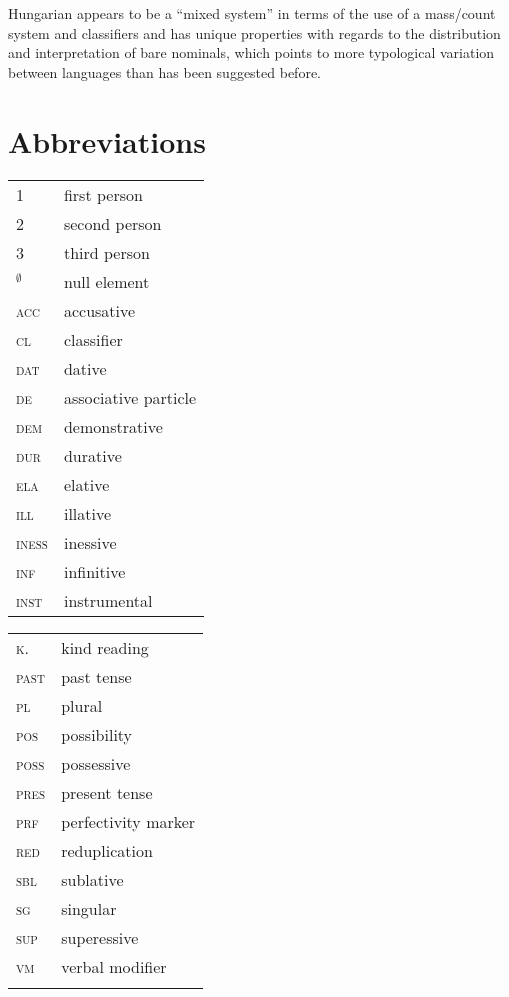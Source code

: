 \documentclass[output=paper]{langscibook}
\begin{document}
Hungarian appears to be a ``mixed system'' in terms of the use of a mass/count system and classifiers and has unique properties with regards to the distribution and interpretation of bare nominals, which points to more typological variation between languages than has been suggested before. 

%

\section*{Abbreviations}

\begin{tabularx}{.5\textwidth}{@{}lX@{}}
\textsc{1}&first person\\
\textsc{2}&second person\\
\textsc{3}&third person\\
\textsc{$_{\emptyset}$}&null element\\
\textsc{acc}&accusative\\
\textsc{cl}&classifier\\
\textsc{dat}&dative\\
\textsc{de}&associative particle\\
\textsc{dem}&demonstrative\\
\textsc{dur}&durative\\
\textsc{ela}&elative\\
\textsc{ill}&illative\\
\textsc{iness}&inessive\\
\textsc{inf}&infinitive\\
\textsc{inst}&instrumental\\
\end{tabularx}%
\begin{tabularx}{.5\textwidth}{@{}lX@{}}
\textsc{k.}&kind reading\\
\textsc{past}&{past tense}\\
\textsc{pl}&plural\\
\textsc{pos}&possibility\\
\textsc{poss}&possessive\\
\textsc{pres}&present tense\\
\textsc{prf}&perfectivity marker\\
\textsc{red}&reduplication\\
\textsc{sbl}&sublative\\
\textsc{sg}&singular\\
\textsc{sup}&superessive\\
\textsc{vm}&verbal modifier\\
{}&{}\\
\end{tabularx}
\end{document}
